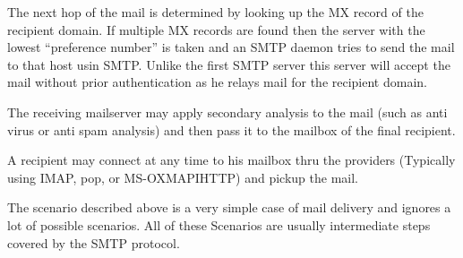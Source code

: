 The next hop of the mail is determined by looking up the MX record of the recipient domain. If multiple MX records are found then the server with the lowest "`preference number"' is taken and an SMTP daemon tries to send the mail to that host usin SMTP. Unlike the first SMTP server this server will accept the mail without prior authentication as he relays mail for the recipient domain.\par

The receiving mailserver may apply secondary analysis to the mail (such as anti virus or anti spam analysis) and then pass it to the mailbox of the final recipient.\par

A recipient may connect at any time to his mailbox thru the providers  (Typically using IMAP, pop, or MS-OXMAPIHTTP) and pickup the mail.\par

The scenario described above is a very simple case of mail delivery and ignores a lot of possible scenarios. All of these Scenarios are usually intermediate steps covered by the SMTP protocol.\par


